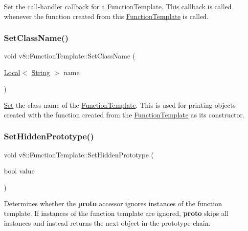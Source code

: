 \mbox{\hyperlink{classv8_1_1Set}{Set}} the call-\/handler callback for a \mbox{\hyperlink{classv8_1_1FunctionTemplate}{Function\+Template}}. This callback is called whenever the function created from this \mbox{\hyperlink{classv8_1_1FunctionTemplate}{Function\+Template}} is called. \mbox{\label{classv8_1_1FunctionTemplate_a491e77dc7ceb5b0fe75880d11f2dbe9e}} 
\subsubsection{\texorpdfstring{Set\+Class\+Name()}{SetClassName()}}
{\footnotesize\ttfamily void v8\+::\+Function\+Template\+::\+Set\+Class\+Name (\begin{DoxyParamCaption}\item[{\mbox{\hyperlink{classv8_1_1Local}{Local}}$<$ \mbox{\hyperlink{classv8_1_1String}{String}} $>$}]{name }\end{DoxyParamCaption})}

\mbox{\hyperlink{classv8_1_1Set}{Set}} the class name of the \mbox{\hyperlink{classv8_1_1FunctionTemplate}{Function\+Template}}. This is used for printing objects created with the function created from the \mbox{\hyperlink{classv8_1_1FunctionTemplate}{Function\+Template}} as its constructor. \mbox{\label{classv8_1_1FunctionTemplate_ade426e8a21d777ae6100e6c1aa7bfaee}} 
\subsubsection{\texorpdfstring{Set\+Hidden\+Prototype()}{SetHiddenPrototype()}}
{\footnotesize\ttfamily void v8\+::\+Function\+Template\+::\+Set\+Hidden\+Prototype (\begin{DoxyParamCaption}\item[{bool}]{value }\end{DoxyParamCaption})}

Determines whether the {\bfseries proto} accessor ignores instances of the function template. If instances of the function template are ignored, {\bfseries proto} skips all instances and instead returns the next object in the prototype chain.

